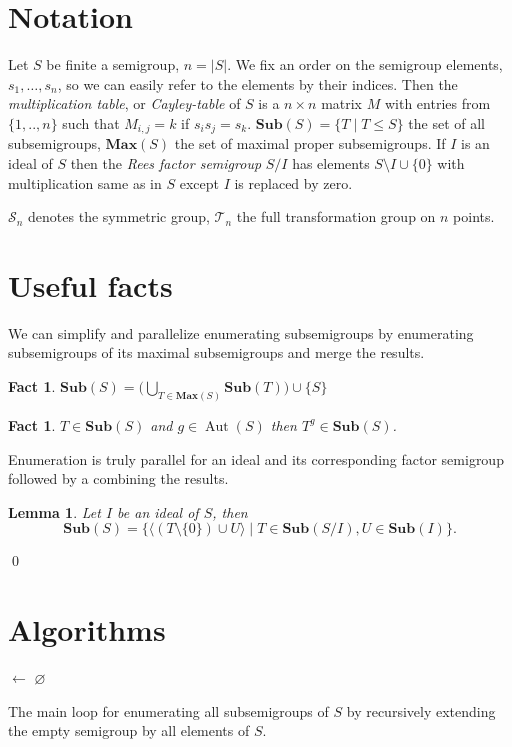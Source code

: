 \documentclass{amsart}
\newcommand{\cT}{{\mathcal T}}
\newcommand{\cS}{{\mathcal S}}
\newcommand{\Sub}{\mathbf{Sub}}
\newcommand{\Max}{\mathbf{Max}}
\DeclareMathOperator{\Aut}{Aut}
\theoremstyle{plain}
\newtheorem{lemma}[theorem]{Lemma}
\newtheorem{fact}[theorem]{Fact}
\theoremstyle{definition}
\begin{document}
\section{Notation}
Let $S$ be finite a semigroup, $n=|S|$.
We fix an order on the semigroup elements, $s_1,\ldots, s_n$, so we can easily refer to the elements by their indices. 
Then the  \emph{multiplication table}, or \emph{Cayley-table} of $S$ is a $n\times n$ matrix $M$ with entries from $\{1,..,n\}$ such that $M_{i,j}=k$ if $s_is_j=s_k$.
$\Sub(S)=\big\{T\mid T\leq S \big\}$ the set of all subsemigroups, $\Max(S)$ the set of maximal proper subsemigroups.
If $I$ is an ideal of $S$ then the \emph{Rees factor semigroup} $S/I$ has elements $S\setminus I\cup\{0\}$ with multiplication same as in $S$ except $I$ is replaced by zero.

$\cS_n$ denotes the symmetric group, $\cT_n$ the full transformation group on $n$ points.
\section{Useful facts}
We can simplify and parallelize enumerating subsemigroups by enumerating subsemigroups of its maximal subsemigroups and merge the results.
\begin{fact}
$\Sub(S)=\big( \bigcup_{T\in \Max(S)}\Sub(T)\big)\cup \{S\}$
\end{fact}

\begin{fact}
$T\in\Sub(S)$ and $g\in \Aut(S)$ then $T^g\in\Sub(S)$.%
\end{fact}


Enumeration is truly parallel for an ideal and its corresponding factor semigroup followed by a combining the results.
\begin{lemma}
Let $I$ be an ideal of $S$, then $$\Sub(S)=\big\{\langle (T\setminus\{0\})\cup U \rangle\mid T\in \Sub(S/I), U\in\Sub(I)\big\}.$$
\end{lemma}
\proof

\qed





\section{Algorithms}
\begin{algorithm}
\Output{$\Sub(S)$}
\BlankLine
\Name{}

\subs $\leftarrow$ $\varnothing$\;
\Return{\subs}\;
\caption{The main loop for enumerating all subsemigroups of $S$ by recursively extending the empty semigroup by all elements of $S$.}
\label{alg:basicloop}
\end{algorithm}
\end{document}
